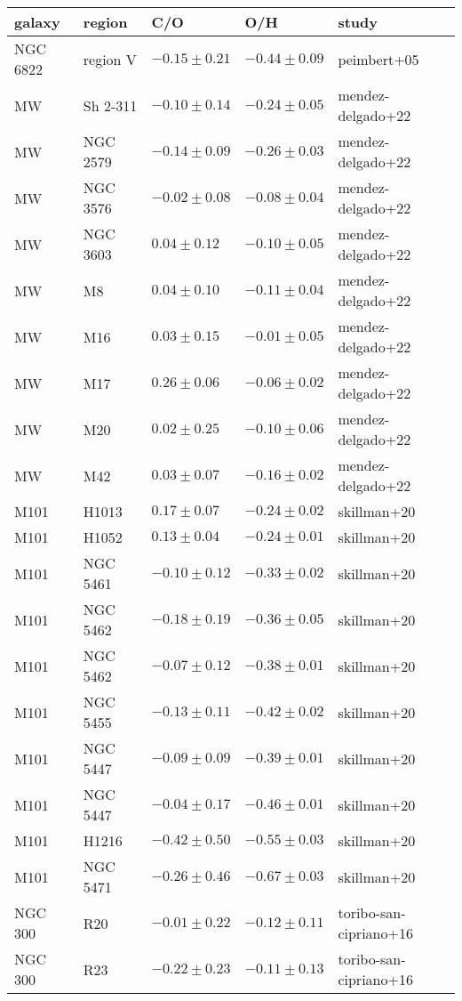 \documentclass[11pt]{article}
\begin{document}
\begin{longtable}{lllll}
\hline
galaxy & region & C/O & O/H & study \\
\hline
NGC 6822 & region V & $-0.15 \pm 0.21$ & $-0.44 \pm 0.09$ & peimbert+05 \\
MW & Sh 2-311 & $-0.10 \pm 0.14$ & $-0.24 \pm 0.05$ & mendez-delgado+22 \\
MW & NGC 2579 & $-0.14 \pm 0.09$ & $-0.26 \pm 0.03$ & mendez-delgado+22 \\
MW & NGC 3576 & $-0.02 \pm 0.08$ & $-0.08 \pm 0.04$ & mendez-delgado+22 \\
MW & NGC 3603 & $0.04 \pm 0.12$ & $-0.10 \pm 0.05$ & mendez-delgado+22 \\
MW & M8 & $0.04 \pm 0.10$ & $-0.11 \pm 0.04$ & mendez-delgado+22 \\
MW & M16 & $0.03 \pm 0.15$ & $-0.01 \pm 0.05$ & mendez-delgado+22 \\
MW & M17 & $0.26 \pm 0.06$ & $-0.06 \pm 0.02$ & mendez-delgado+22 \\
MW & M20 & $0.02 \pm 0.25$ & $-0.10 \pm 0.06$ & mendez-delgado+22 \\
MW & M42 & $0.03 \pm 0.07$ & $-0.16 \pm 0.02$ & mendez-delgado+22 \\
M101 & H1013 & $0.17 \pm 0.07$ & $-0.24 \pm 0.02$ & skillman+20 \\
M101 & H1052 & $0.13 \pm 0.04$ & $-0.24 \pm 0.01$ & skillman+20 \\
M101 & NGC 5461 & $-0.10 \pm 0.12$ & $-0.33 \pm 0.02$ & skillman+20 \\
M101 & NGC 5462 & $-0.18 \pm 0.19$ & $-0.36 \pm 0.05$ & skillman+20 \\
M101 & NGC 5462 & $-0.07 \pm 0.12$ & $-0.38 \pm 0.01$ & skillman+20 \\
M101 & NGC 5455 & $-0.13 \pm 0.11$ & $-0.42 \pm 0.02$ & skillman+20 \\
M101 & NGC 5447 & $-0.09 \pm 0.09$ & $-0.39 \pm 0.01$ & skillman+20 \\
M101 & NGC 5447 & $-0.04 \pm 0.17$ & $-0.46 \pm 0.01$ & skillman+20 \\
M101 & H1216 & $-0.42 \pm 0.50$ & $-0.55 \pm 0.03$ & skillman+20 \\
M101 & NGC 5471 & $-0.26 \pm 0.46$ & $-0.67 \pm 0.03$ & skillman+20 \\
NGC 300 & R20 & $-0.01 \pm 0.22$ & $-0.12 \pm 0.11$ & toribo-san-cipriano+16 \\
NGC 300 & R23 & $-0.22 \pm 0.23$ & $-0.11 \pm 0.13$ & toribo-san-cipriano+16 \\

\end{longtable}
\end{document}
